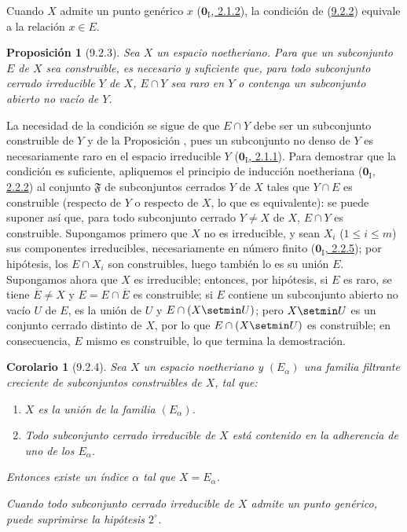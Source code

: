 \documentclass[10pt,oneside,openany]{book}
\theoremstyle{egaenv}\newtheorem*{env}{---}
\theoremstyle{egastatement}
\newtheorem*{proposition}{Proposición}
\newtheorem*{corollary}{Corolario}
\theoremstyle{egadescription}
\renewcommand{\leq}{\leqslant}
\begin{document}
Cuando $X$ admite un punto genérico $x$
(\hyperref[0.2.1.2-fr]{$\mathbf{0}_{\mathrm I}$, 2.1.2}), la condición de (\hyperref[0.9.2.2-fr]{9.2.2}) equivale a la relación $x\in E$.

\begin{proposition}[9.2.3]
\label{0.9.2.3}
\label{0.9.2.3-fr}
Sea $X$ un espacio noetheriano.
Para que un subconjunto $E$ de $X$ sea construible, es necesario y suficiente que, para todo subconjunto cerrado irreducible $Y$ de $X$, $E\cap Y$ sea raro en $Y$ o contenga un subconjunto abierto no vacío de $Y$.
\end{proposition}


La necesidad de la condición se sigue de que $E\cap Y$ debe ser un subconjunto construible de $Y$ y de la Proposición , pues un subconjunto no denso de $Y$ es necesariamente raro en el espacio irreducible $Y$ (\hyperref[0.2.1.1-fr]{$\mathbf{0}_{\mathrm I}$, 2.1.1}). Para demostrar que la condición es suficiente, apliquemos el principio de inducción noetheriana (\hyperref[0.2.2.2-fr]{$\mathbf{0}_{\mathrm I}$, 2.2.2}) al conjunto
$\mathfrak{F}$ de subconjuntos cerrados $Y$ de $X$ tales que $Y\cap E$ es construible (respecto de $Y$ o respecto de $X$, lo que es equivalente): se puede suponer así que, para todo subconjunto cerrado $Y\ne X$ de $X$, $E\cap Y$ es construible.
Supongamos primero que $X$ no es irreducible, y sean $X_i$ ($1\leq i\leq m$) sus componentes irreducibles, necesariamente en número finito (\hyperref[0.2.2.5-fr]{$\mathbf{0}_{\mathrm I}$, 2.2.5}); por hipótesis, los
$E\cap X_i$ son construibles, luego también lo es su unión $E$.
Supongamos ahora que $X$ es irreducible; entonces, por hipótesis, si $E$ es raro, se tiene $\overline{E}\ne X$ y $E=E\cap\overline{E}$ es construible; si $E$ contiene un subconjunto abierto no vacío $U$ de $E$, es la unión de $U$ y $E\cap(X\setmin U)$; pero $X\setmin U$ es un conjunto cerrado distinto de $X$, por lo que $E\cap(X\setmin U)$ es construible; en consecuencia, $E$ mismo es construible, lo que termina la demostración.


\begin{corollary}[9.2.4]
\label{0.9.2.4}
\label{0.9.2.4-fr}
Sea $X$ un espacio noetheriano y $(E_\alpha)$ una familia filtrante creciente de subconjuntos construibles de $X$, tal que:
\begin{enumerate}
  \item[$1^\circ$] $X$ es la unión de la familia $(E_\alpha)$.
  \item[$2^\circ$] Todo subconjunto cerrado irreducible de $X$ está contenido en la adherencia de uno de los $E_\alpha$.
\end{enumerate}

Entonces existe un índice $\alpha$ tal que $X=E_\alpha$.

Cuando todo subconjunto cerrado irreducible de $X$ admite un punto genérico, puede suprimirse la hipótesis $2^\circ$.
\end{corollary}
\end{document}
